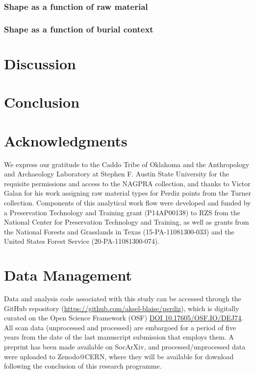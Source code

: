 \documentclass[review]{elsarticle}
\begin{document}
\subsubsection*{Shape as a function of raw material}



\subsubsection*{Shape as a function of burial context}



\section*{Discussion}



\section*{Conclusion}



\section*{Acknowledgments}

We express our gratitude to the Caddo Tribe of Oklahoma and the Anthropology and Archaeology Laboratory at Stephen F. Austin State University for the requisite permissions and access to the NAGPRA collection, and thanks to Victor Galan for his work assigning raw material types for Perdiz points from the Turner collection. Components of this analytical work flow were developed and funded by a Preservation Technology and Training grant (P14AP00138) to RZS from the National Center for Preservation Technology and Training, as well as grants from the National Forests and Grasslands in Texas (15-PA-11081300-033) and the United States Forest Service (20-PA-11081300-074).

\section*{Data Management}

Data and analysis code associated with this study can be accessed through the GitHub repository (\href{https://github.com/aksel-blaise/perdiz}{https://github.com/aksel-blaise/perdiz}), which is digitally curated on the Open Science Framework (OSF) \href{https://osf.io/dej74/}{DOI 10.17605/OSF.IO/DEJ74}. All scan data (unprocessed and processed) are embargoed for a period of five years from the date of the last manuscript submission that employs them. A preprint has been made available on SocArXiv, and processed/unprocessed data were uploaded to Zenodo@CERN, where they will be available for download following the conclusion of this research programme.


\end{document}
